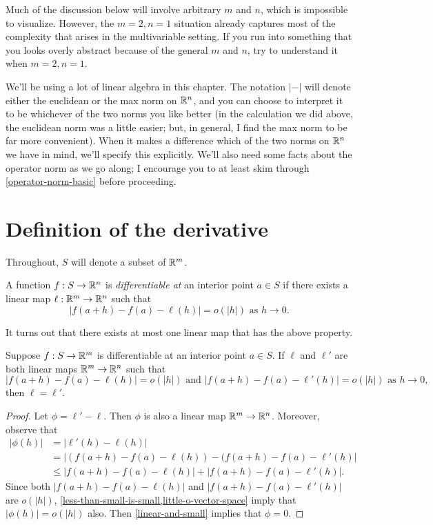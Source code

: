 Much of the discussion below will involve arbitrary $m$ and $n$, which is impossible to visualize. However, the $m = 2, n = 1$ situation already captures most of the complexity that arises in the multivariable setting. If you run into something that you looks overly abstract because of the general $m$ and $n$, try to understand it when $m = 2, n = 1$. 

We'll be using a lot of linear algebra in this chapter. The notation $|-|$ will denote either the euclidean or the max norm on $\mathbb{R}^n$, and you can choose to interpret it to be whichever of the two norms you like better (in the calculation we did above, the euclidean norm was a little easier; but, in general, I find the max norm to be far more convenient). When it makes a difference which of the two norms on $\mathbb{R}^n$ we have in mind, we'll specify this explicitly.  We'll also need some facts about the operator norm as we go along; I encourage you to at least skim through \cref{operator-norm-basic} before proceeding. 

\section{Definition of the derivative}

Throughout, $S$ will denote a subset of $\mathbb{R}^m$. 

\begin{definition} 
	A function $f : S \to \mathbb{R}^n$ is \emph{differentiable at} an interior point $a \in S$ if there exists a linear map $\ell : \mathbb{R}^m \to \mathbb{R}^n$ such that
	\[ |f(a+h)-f(a)-\ell(h)| = o(|h|) \text{ as } h \to 0. \]
\end{definition}

It turns out that there exists at most one linear map that has the above property. 

\begin{lemma} \label{differential-unique}
	Suppose $f : S \to \mathbb{R}^m$ is differentiable at an interior point $a \in S$. If $\ell$ and $\ell'$ are both linear maps $\mathbb{R}^m \to \mathbb{R}^n$ such that
	\[ |f(a+h) - f(a) - \ell(h)| = o(|h|) \text { and } |f(a+h) - f(a) - \ell'(h)| = o(|h|) \text{ as } h \to 0, \]
	then $\ell = \ell'$. 
\end{lemma}

\begin{proof}
	Let $\phi = \ell' - \ell$. Then $\phi$ is also a linear map $\mathbb{R}^m \to \mathbb{R}^n$. Moreover, observe that
	\[ \begin{aligned} |\phi(h)| &= |\ell'(h) - \ell(h)| \\
	&= |(f(a+h)-f(a)-\ell(h))-(f(a+h)-f(a)-\ell'(h)| \\
	&\leq |f(a+h)-f(a)-\ell(h)| + |f(a+h)-f(a)-\ell'(h)|. \end{aligned} \]
	Since both $|f(a+h)-f(a)-\ell(h)|$ and $|f(a+h)-f(a)-\ell'(h)|$ are $o(|h|)$, \cref{less-than-small-is-small,little-o-vector-space} imply that $|\phi(h)| = o(|h|)$ also. Then \cref{linear-and-small} implies that $\phi = 0$. 
\end{proof}

